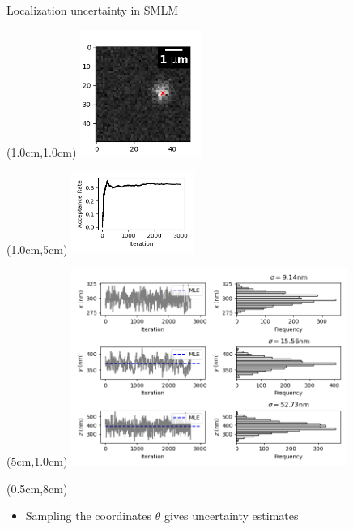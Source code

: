 \documentclass{beamer}					%
\begin{document}
\begin{frame}{Localization uncertainty in SMLM}
\begin{textblock*}{4cm}(1.0cm,1.0cm)
\includegraphics[width=4cm]{MCMC/Figure_1.png}
\end{textblock*}
\begin{textblock*}{4cm}(1.0cm,5cm)
\includegraphics[width=4cm]{MCMC/Figure_2.png}
\end{textblock*}
\begin{textblock*}{9cm}(5cm,1.0cm)
\includegraphics[width=9cm]{MCMC/Figure_3.png}
\end{textblock*}
\begin{textblock*}{13cm}(0.5cm,8cm)
\begin{itemize}
\item Sampling the coordinates $\theta$ gives uncertainty estimates
\end{itemize}
\end{textblock*}

\end{frame}
\end{document}

